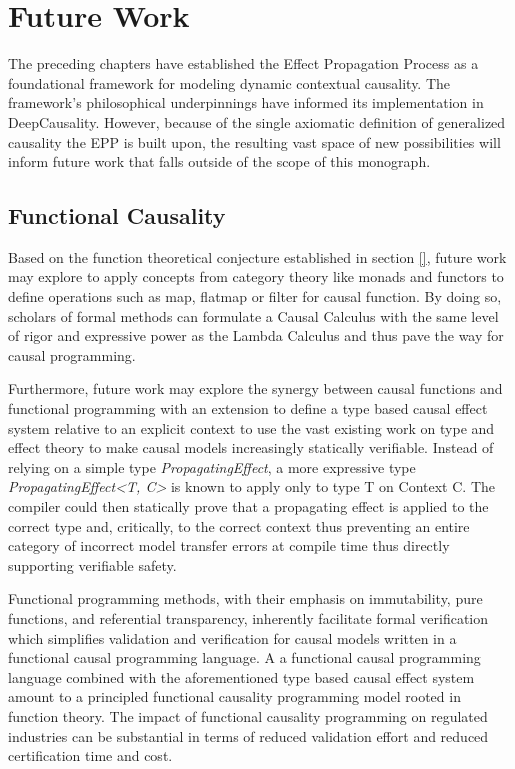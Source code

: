 \section{Future Work}
\label{sec:future_work}

The preceding chapters have established the Effect Propagation Process as a foundational framework for modeling dynamic contextual causality. The framework's philosophical underpinnings have informed its implementation in DeepCausality. However, because of the single axiomatic definition of generalized causality the EPP is built upon, the resulting vast space of new possibilities will inform future work that falls outside of the scope of this monograph. 

\subsection{Functional Causality}
\label{sec:future_work_functional_causality}

Based on the function theoretical conjecture established in section \ref{}, future work may explore to apply concepts from category theory like monads and functors to define operations such as map, flatmap or filter for causal function. By doing so, scholars of formal methods can formulate a Causal Calculus with the same level of rigor and expressive power as the Lambda Calculus and thus pave the way for causal programming.
 
Furthermore, future work may explore the synergy between causal functions and functional programming with an extension to define a type based causal effect system relative to an explicit context to use the vast existing work on type and effect theory to make causal models increasingly statically verifiable. Instead of relying on a simple type \textit{PropagatingEffect}, a more expressive type \textit{PropagatingEffect<T, C>} is known to apply only to type T on Context C. The compiler could then statically prove that a propagating effect is applied to the correct type and, critically, to the correct context thus preventing an entire category of incorrect model transfer errors at compile time thus directly supporting verifiable safety.  
 
Functional programming methods, with their emphasis on immutability, pure functions, and referential transparency, inherently facilitate formal verification which simplifies validation and verification for causal models written in a functional causal programming language. A a functional causal programming language combined with the aforementioned type based causal effect system amount to a principled functional causality programming model rooted in function theory. The impact of functional causality programming on regulated industries can be substantial in terms of reduced validation effort and reduced certification time and cost. 

